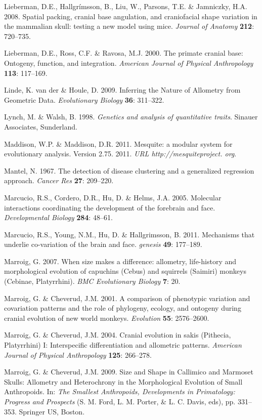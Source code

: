 \documentclass[12pt,twoside]{report}
\begin{document}
Lieberman, D.E., Hallgrímsson, B., Liu, W., Parsons, T.E. \& Jamniczky,
H.A. 2008. Spatial packing, cranial base angulation, and craniofacial
shape variation in the mammalian skull: testing a new model using mice.
\emph{Journal of Anatomy} \textbf{212}: 720--735.

Lieberman, D.E., Ross, C.F. \& Ravosa, M.J. 2000. The primate cranial
base: Ontogeny, function, and integration. \emph{American Journal of
Physical Anthropology} \textbf{113}: 117--169.

Linde, K. van der \& Houle, D. 2009. Inferring the Nature of Allometry
from Geometric Data. \emph{Evolutionary Biology} \textbf{36}: 311--322.

Lynch, M. \& Walsh, B. 1998. \emph{Genetics and analysis of quantitative
traits}. Sinauer Associates, Sunderland.

Maddison, W.P. \& Maddison, D.R. 2011. Mesquite: a modular system for
evolutionary analysis. Version 2.75. 2011. \emph{URL
http://mesquiteproject. org}.

Mantel, N. 1967. The detection of disease clustering and a generalized
regression approach. \emph{Cancer Res} \textbf{27}: 209--220.

Marcucio, R.S., Cordero, D.R., Hu, D. \& Helms, J.A. 2005. Molecular
interactions coordinating the development of the forebrain and face.
\emph{Developmental Biology} \textbf{284}: 48--61.

Marcucio, R.S., Young, N.M., Hu, D. \& Hallgrimsson, B. 2011. Mechanisms
that underlie co-variation of the brain and face. \emph{genesis}
\textbf{49}: 177--189.

Marroig, G. 2007. When size makes a difference: allometry, life-history
and morphological evolution of capuchins (Cebus) and squirrels (Saimiri)
monkeys (Cebinae, Platyrrhini). \emph{BMC Evolutionary Biology}
\textbf{7}: 20.

Marroig, G. \& Cheverud, J.M. 2001. A comparison of phenotypic variation
and covariation patterns and the role of phylogeny, ecology, and
ontogeny during cranial evolution of new world monkeys. \emph{Evolution}
\textbf{55}: 2576--2600.

Marroig, G. \& Cheverud, J.M. 2004. Cranial evolution in sakis
(Pithecia, Platyrrhini) I: Interspecific differentiation and allometric
patterns. \emph{American Journal of Physical Anthropology} \textbf{125}:
266--278.

Marroig, G. \& Cheverud, J.M. 2009. Size and Shape in Callimico and
Marmoset Skulls: Allometry and Heterochrony in the Morphological
Evolution of Small Anthropoids. In: \emph{The Smallest Anthropoids,
Developments in Primatology: Progress and Prospects} (S. M. Ford, L. M.
Porter, \& L. C. Davis, eds), pp. 331--353. Springer US, Boston.
\end{document}
